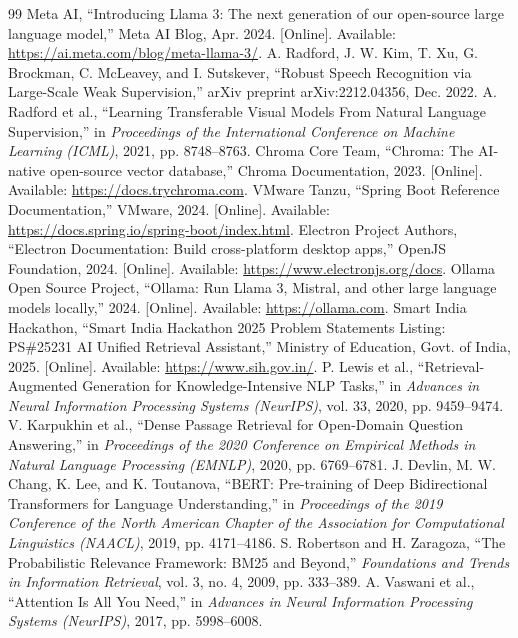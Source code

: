 \documentclass[12pt,a4paper]{report}
\begin{document}
\clearpage
{}
\begin{thebibliography}{99}
\fontsize{10}{12}\selectfont
\setlength{\itemsep}{0pt plus 0.3ex}
\setlength{\parsep}{0pt}
 Meta AI, ``Introducing Llama 3: The next generation of our open-source large language model,'' Meta AI Blog, Apr. 2024. [Online]. Available: \url{https://ai.meta.com/blog/meta-llama-3/}.
 A. Radford, J. W. Kim, T. Xu, G. Brockman, C. McLeavey, and I. Sutskever, ``Robust Speech Recognition via Large-Scale Weak Supervision,'' arXiv preprint arXiv:2212.04356, Dec. 2022.
 A. Radford et al., ``Learning Transferable Visual Models From Natural Language Supervision,'' in \textit{Proceedings of the International Conference on Machine Learning (ICML)}, 2021, pp. 8748--8763.
 Chroma Core Team, ``Chroma: The AI-native open-source vector database,'' Chroma Documentation, 2023. [Online]. Available: \url{https://docs.trychroma.com}.
 VMware Tanzu, ``Spring Boot Reference Documentation,'' VMware, 2024. [Online]. Available: \url{https://docs.spring.io/spring-boot/index.html}.
 Electron Project Authors, ``Electron Documentation: Build cross-platform desktop apps,'' OpenJS Foundation, 2024. [Online]. Available: \url{https://www.electronjs.org/docs}.
 Ollama Open Source Project, ``Ollama: Run Llama 3, Mistral, and other large language models locally,'' 2024. [Online]. Available: \url{https://ollama.com}.
 Smart India Hackathon, ``Smart India Hackathon 2025 Problem Statements Listing: PS\#25231 AI Unified Retrieval Assistant,'' Ministry of Education, Govt. of India, 2025. [Online]. Available: \url{https://www.sih.gov.in/}.
 P. Lewis et al., ``Retrieval-Augmented Generation for Knowledge-Intensive NLP Tasks,'' in \textit{Advances in Neural Information Processing Systems (NeurIPS)}, vol. 33, 2020, pp. 9459--9474.
 V. Karpukhin et al., ``Dense Passage Retrieval for Open-Domain Question Answering,'' in \textit{Proceedings of the 2020 Conference on Empirical Methods in Natural Language Processing (EMNLP)}, 2020, pp. 6769--6781.
 J. Devlin, M. W. Chang, K. Lee, and K. Toutanova, ``BERT: Pre-training of Deep Bidirectional Transformers for Language Understanding,'' in \textit{Proceedings of the 2019 Conference of the North American Chapter of the Association for Computational Linguistics (NAACL)}, 2019, pp. 4171--4186.
 S. Robertson and H. Zaragoza, ``The Probabilistic Relevance Framework: BM25 and Beyond,'' \textit{Foundations and Trends in Information Retrieval}, vol. 3, no. 4, 2009, pp. 333--389.
 A. Vaswani et al., ``Attention Is All You Need,'' in \textit{Advances in Neural Information Processing Systems (NeurIPS)}, 2017, pp. 5998--6008.
\end{thebibliography}
\end{document}
